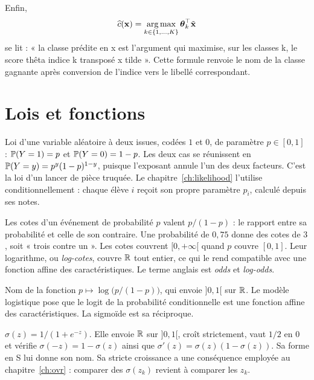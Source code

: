 Enfin,
\[
  \widehat c(\mathbf{x})=\operatorname*{arg\,max}_{k\in\{1,\ldots,K\}}\boldsymbol{\theta}_k^\top\tilde{\mathbf{x}}
\]
se lit : « la classe prédite en x est l'argument qui maximise, sur les classes k,
le score thêta indice k transposé x tilde ». Cette formule renvoie le nom de la
classe gagnante après conversion de l'indice vers le libellé correspondant.

\section{Lois et fonctions}
\label{sec:lois}

\begin{description}[style=nextline,leftmargin=0pt]
  \item[\dsym{bernoulli}{Loi de Bernoulli}]
  Loi d'une variable aléatoire à deux issues, codées $1$ et $0$, de paramètre
  $p\in[0,1]$ : $\mathbb{P}(Y=1)=p$ et $\mathbb{P}(Y=0)=1-p$. Les deux cas se réunissent en
  $\mathbb{P}(Y=y)=p^y(1-p)^{1-y}$, puisque l'exposant annule l'un des deux facteurs.
  C'est la loi d'un lancer de pièce truquée. Le chapitre~\ref{ch:likelihood}
  l'utilise conditionnellement : chaque élève $i$ reçoit son propre paramètre
  $p_i$, calculé depuis ses notes.

  \item[\dsym{cotes}{Cotes et log-cotes}]
  Les cotes d'un événement de probabilité $p$ valent $p/(1-p)$ : le rapport entre
  sa probabilité et celle de son contraire. Une probabilité de $0{,}75$ donne des
  cotes de $3$, soit « trois contre un ». Les cotes couvrent
  $[0,+\infty[$ quand $p$ couvre $[0,1]$. Leur logarithme, ou \emph{log-cotes},
  couvre $\mathbb{R}$ tout entier, ce qui le rend compatible avec une fonction affine des
  caractéristiques. Le terme anglais est \emph{odds} et \emph{log-odds}.

  \item[\dsym{logit}{Logit}]
  Nom de la fonction $p\mapsto\log\!\big(p/(1-p)\big)$, qui envoie $]0,1[$ sur
  $\mathbb{R}$. Le modèle logistique pose que le logit de la probabilité conditionnelle
  est une fonction affine des caractéristiques. La sigmoïde est sa réciproque.

  \item[\dsym{sigmoide}{Fonction logistique, ou sigmoïde}]
  $\sigma(z)=1/(1+e^{-z})$. Elle envoie $\mathbb{R}$ sur $]0,1[$, croît strictement,
  vaut $1/2$ en $0$ et vérifie $\sigma(-z)=1-\sigma(z)$ ainsi que
  $\sigma'(z)=\sigma(z)(1-\sigma(z))$. Sa forme en S lui donne son nom. Sa stricte
  croissance a une conséquence employée au chapitre~\ref{ch:ovr} : comparer des
  $\sigma(z_k)$ revient à comparer les $z_k$.


\end{description}
